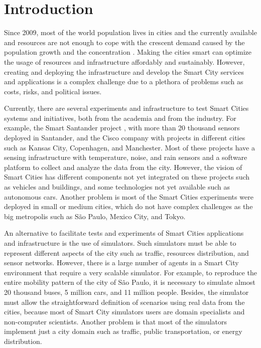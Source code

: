 \chapter{Introduction}
\label{cap:introducao}

Since 2009, most of the world population lives in cities \citep{un2009urbanRural} and the currently available and resources are not enough to cope with the crescent demand caused by the population growth and the concentration \citep{caragliu2011smart}. Making the cities smart can optimize the usage of resources and infrastructure affordably and sustainably. However, creating and deploying the infrastructure and develop the Smart City services and applications is a complex challenge due to a plethora of problems such as costs, risks, and political issues.

Currently, there are several experiments and infrastructure to test Smart Cities systems and initiatives, both from the academia and from the industry. For example, the Smart Santander project \citep{sanchez2014smartsantander}, with more than 20 thousand sensors deployed in Santander, and the Cisco company with projects in different cities such as Kansas City, Copenhagen, and Manchester. Most of these projects have a sensing infrastructure with temperature, noise, and rain sensors and a software platform to collect and analyze the data from the city. However, the vision of Smart Cities has different components not yet integrated on these projects such as vehicles and buildings, and some technologies not yet available such as autonomous cars. Another problem is most of the Smart Cities experiments were deployed in small or medium cities, which do not have complex challenges as the big metropolis such as S\~ao Paulo, Mexico City, and Tokyo.

An alternative to facilitate tests and experiments of Smart Cities applications and infrastructure is the use of simulators. Such simulators must be able to represent different aspects of the city such as traffic, resources distribution, and sensor networks. However, there is a large number of agents in a Smart City environment that require a very scalable simulator. For example, to reproduce the entire mobility pattern of the city of S\~ao Paulo, it is necessary to simulate almost  20 thousand buses, 5 million cars, and 11 million people. Besides, the simulator must allow the straightforward definition of scenarios using real data from the cities, because most of Smart City simulators users are domain specialists and non-computer scientists. Another problem is that most of the simulators implement just a city domain such as traffic, public transportation, or energy distribution.

